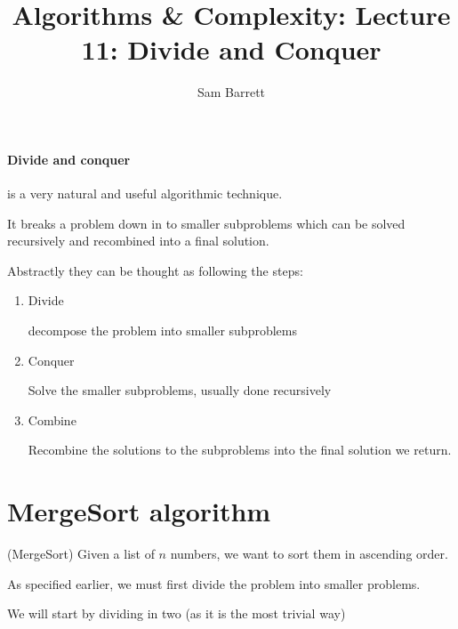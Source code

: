 \documentclass{article}
\title{Algorithms \& Complexity: Lecture 11: Divide and Conquer}
\author{Sam Barrett}
\begin{document}
\maketitle

\paragraph{Divide and conquer} is a very natural and useful algorithmic technique.

It breaks a problem down in to smaller subproblems which can be solved recursively and recombined into a final solution.

Abstractly they can be thought as following the steps:

\begin{enumerate}
  \item Divide

        decompose the problem into smaller subproblems
  \item Conquer

        Solve the smaller subproblems, usually done recursively
  \item Combine

        Recombine the solutions to the subproblems into the final solution we return.
\end{enumerate}



\section{MergeSort algorithm}

\begin{problem}(MergeSort)
Given a list of $n$ numbers, we want to sort them in ascending order.
\end{problem}

As specified earlier, we must first divide the problem into smaller problems.

We will start by dividing in two (as it is the most trivial way)

\begin{center}
\end{center}
\end{document}
